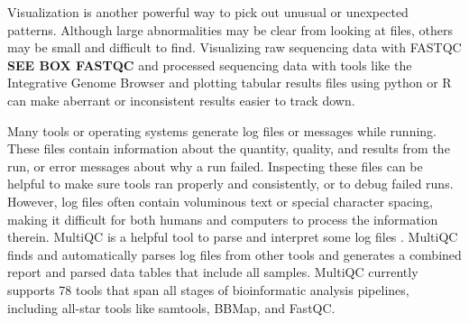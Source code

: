 \documentclass[10pt,letterpaper]{article}
\begin{document}
Visualization is another powerful way to pick out unusual or unexpected patterns. 
Although large abnormalities may be clear from looking at files, others may be small and difficult to find. 
Visualizing raw sequencing data with FASTQC \textbf{SEE BOX FASTQC} and processed sequencing data with tools like the Integrative Genome Browser and plotting tabular results files using python or R can make aberrant or inconsistent results easier to track down.

Many tools or operating systems generate log files or messages while running. 
These files contain information about the quantity, quality, and results from the run, or error messages about why a run failed. 
Inspecting these files can be helpful to make sure tools ran properly and consistently, or to debug failed runs. 
However, log files often contain voluminous text or special character spacing, making it difficult for both humans and computers to process the information therein. 
MultiQC is a helpful tool to parse and interpret some log files \cite{ewels2016}. 
MultiQC finds and automatically parses log files from other tools and generates a combined report and parsed data tables that include all samples. 
MultiQC currently supports 78 tools that span all stages of bioinformatic analysis pipelines, including all-star tools like samtools, BBMap, and FastQC. 
\end{document}
